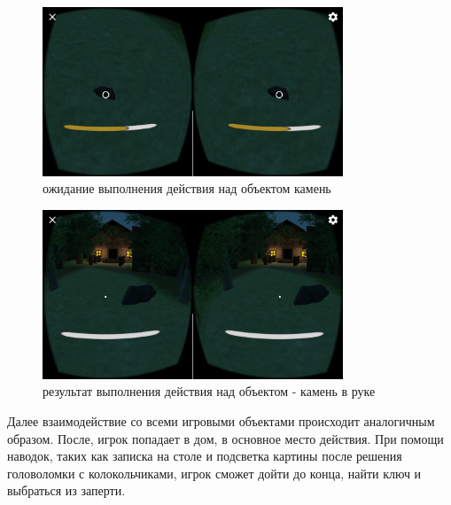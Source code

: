 \begin{figure}[h!]
    \centering
    \includegraphics[width=0.8\textwidth]{./screenshots/pick_stone1.jpg}
    \caption{\small{ожидание выполнения действия над объектом камень}}
    \label{pick_stone}
\end{figure} 

\begin{figure}[h!]
    \centering
    \includegraphics[width=0.8\textwidth]{./screenshots/picked_stone1.jpg}
    \caption{\small{результат выполнения действия над объектом - камень в руке}}
    \label{picked_stone}
\end{figure} 
\newpage
Далее взаимодействие со всеми игровыми объектами происходит аналогичным образом.
После, игрок попадает в дом, в основное место действия. При помощи наводок, таких как записка на столе и подсветка картины после решения головоломки с колокольчиками, игрок сможет дойти до конца, найти ключ и выбраться из заперти.

\newpage

